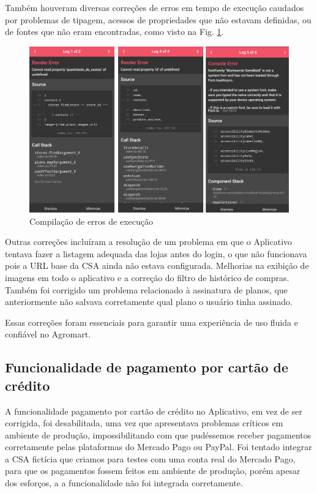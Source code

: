 Também houveram diversas correções de erros em tempo de execução caudados por problemas de tipagem, acessos de propriedades que não estavam definidas, ou de fontes que não eram encontradas, como visto na Fig. \ref{erros}.

\begin{figure}[h]
	\centering
	\includegraphics[keepaspectratio=true,scale=0.2]{figuras/erros.png}
	\caption{Compilação de erros de execução}
	\label{erros}
\end{figure}

Outras correções incluíram a resolução de um problema em que o Aplicativo tentava fazer a listagem adequada das lojas antes do login, o que não funcionava pois a URL base da CSA ainda não estava configurada. Melhorias na exibição de imagens em todo o aplicativo e a correção do filtro de histórico de compras. Também foi corrigido um problema relacionado à assinatura de planos, que anteriormente não salvava corretamente qual plano o usuário tinha assinado.

Essas correções foram essenciais para garantir uma experiência de uso fluida e confiável no Agromart.

\subsection{Funcionalidade de pagamento por cartão de crédito}
A funcionalidade pagamento por cartão de crédito no Aplicativo, em vez de ser corrigida, foi desabilitada, uma vez que apresentava problemas críticos em ambiente de produção, impossibilitando com que pudéssemos receber pagamentos corretamente pelas plataformas do Mercado Pago ou PayPal. Foi tentado integrar a CSA fictícia que criamos para testes com uma conta real do Mercado Pago, para que os pagamentos fossem feitos em ambiente de produção, porém apesar dos esforços, a a funcionalidade não foi integrada corretamente.

